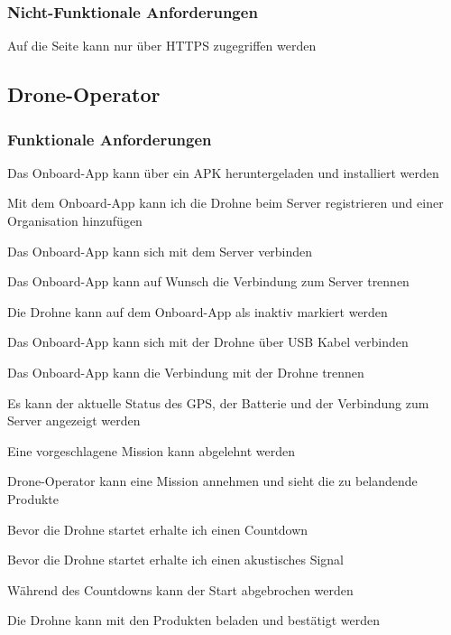 \subsubsection{Nicht-Funktionale Anforderungen}
\begin{todolist}
	\item Auf die Seite kann nur über HTTPS zugegriffen werden
\end{todolist}

\subsection{Drone-Operator}
\subsubsection{Funktionale Anforderungen}
\begin{todolist}
	\item Das Onboard-App kann über ein APK heruntergeladen und installiert werden
	\item[\done] Mit dem Onboard-App kann ich die Drohne beim Server registrieren und einer Organisation hinzufügen
	\item[\done] Das Onboard-App kann sich mit dem Server verbinden
	\item Das Onboard-App kann auf Wunsch die Verbindung zum Server trennen
	\item Die Drohne kann auf dem Onboard-App als inaktiv markiert werden
	\item[\done] Das Onboard-App kann sich mit der Drohne über USB Kabel verbinden
	\item[\done] Das Onboard-App kann die Verbindung mit der Drohne trennen
	\item Es kann der aktuelle Status des GPS, der Batterie und der Verbindung zum Server angezeigt werden
	\item Eine vorgeschlagene Mission kann abgelehnt werden
	\item Drone-Operator kann eine Mission annehmen und sieht die zu belandende Produkte
	\item Bevor die Drohne startet erhalte ich einen Countdown
	\item Bevor die Drohne startet erhalte ich einen akustisches Signal
	\item Während des Countdowns kann der Start abgebrochen werden
	\item Die Drohne kann mit den Produkten beladen und bestätigt werden
\end{todolist}

